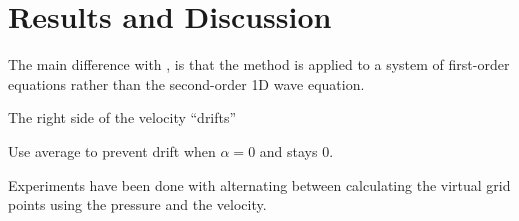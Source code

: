 \section{Results and Discussion}

The main difference with \cite{Willemsen2021}, is that the method is applied to a system of first-order equations rather than the second-order 1D wave equation.

The right side of the velocity ``drifts''

Use average to prevent drift when $\alpha = 0$ and stays 0.


Experiments have been done with alternating between calculating the virtual grid points using the pressure and the velocity.  



